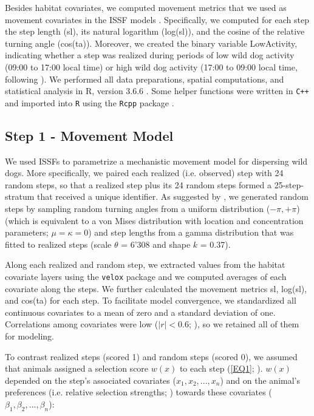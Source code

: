 \documentclass[abstract=on,10pt,a4paper,bibliography=totocnumbered]{article}
\begin{document}
Besides habitat covariates, we computed movement metrics that we used as
movement covariates in the ISSF models \citep{Avgar.2016, Fieberg.2021}.
Specifically, we computed for each step the step length (\textsf{sl}), its
natural logarithm (\textsf{log(sl)}), and the cosine of the relative turning
angle (\textsf{cos(ta)}). Moreover, we created the binary variable
\textsf{LowActivity}, indicating whether a step was realized during periods of
low wild dog activity (09:00 to 17:00 local time) or high wild dog activity
(17:00 to 09:00 local time, following \citealp{Cozzi.2012}). We performed all
data preparations, spatial computations, and statistical analysis in R, version
3.6.6 \citep{R.2020}. Some helper functions were written in {\tt C++} and
imported into {\tt R} using the {\tt Rcpp} package \citep{Eddelbuettel.2011,
Eddelbuettel.2013}.

\subsection{Step 1 - Movement Model}
We used ISSFs \citep{Avgar.2016} to parametrize a mechanistic movement model for
dispersing wild dogs. More specifically, we paired each realized (i.e. observed)
step with 24 random steps, so that a realized step plus its 24 random steps
formed a 25-step-stratum that received a unique identifier. As suggested by
\cite{Avgar.2016}, we generated random steps by sampling random turning angles
from a uniform distribution (\(-\pi, +\pi\)) (which is equivalent to a von Mises
distribution with location and concentration parameters; \(\mu = \kappa = 0\))
and step lengths from a gamma distribution that was fitted to realized steps
(scale \(\theta\) = 6'308 and shape \(k\) = 0.37).

Along each realized and random step, we extracted values from the habitat
covariate layers using the {\tt velox} package \citep{Hunziker.2021} and we
computed averages of each covariate along the steps. We further calculated the
movement metrics \textsf{sl}, \textsf{log(sl)}, and \textsf{cos(ta)} for each
step. To facilitate model convergence, we standardized all continuous covariates
to a mean of zero and a standard deviation of one. Correlations among covariates
were low (\(|r| < 0.6\); \citealp{Latham.2011}), so we retained all of them for
modeling.

To contrast realized steps (scored 1) and random steps (scored 0), we assumed
that animals assigned a selection score \(w(x)\) to each step (\ref{EQ1};
\citealp{Fortin.2005}). \(w(x)\) depended on the step's associated covariates
(\(x_1, x_2, ..., x_n\)) and on the animal's preferences (i.e. relative
selection strengths; \citealp{Avgar.2017}) towards these covariates (\(\beta_1,
\beta_2, ..., \beta_n\)):
\end{document}
